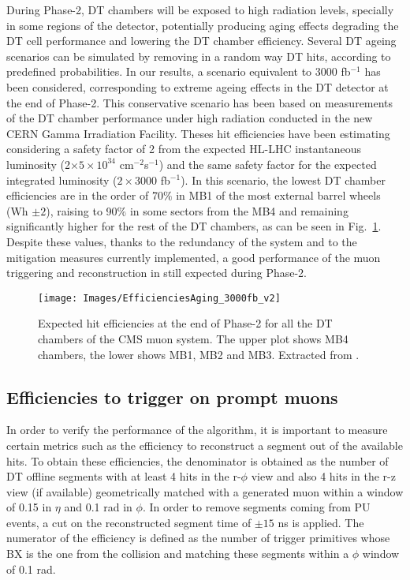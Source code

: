 \documentclass[../main.tex]{subfiles}
\begin{document}
During Phase-2, DT chambers will be exposed to high radiation levels, specially in some regions of the detector, potentially producing aging effects degrading the DT cell performance and lowering the DT chamber efficiency. Several DT ageing scenarios can be simulated by removing in a random way DT hits, according to predefined probabilities. In our results, a scenario equivalent to 3000 fb${}^{-1}$ has been considered, corresponding to extreme ageing effects in the DT detector at the end of Phase-2. This conservative scenario has been based on measurements of the DT chamber performance under high radiation conducted in the new CERN Gamma Irradiation Facility. Theses hit efficiencies have been estimating considering a safety factor of 2 from the expected HL-LHC instantaneous luminosity (2$\times 5\times 10^{34}$ cm${}^{-2}$s${}^{-1}$) and the same safety factor for the expected integrated luminosity ($2\times$3000 fb${}^{-1}$). In this scenario, the lowest DT chamber efficiencies are in the order of 70$\%$ in MB1 of the most external barrel wheels (Wh $\pm2$), raising to 90$\%$ in some sectors from the MB4 and remaining significantly higher for the rest of the DT chambers, as can be seen in Fig.~\ref{dts:fig:ageing}. Despite these values, thanks to the redundancy of the system and to the mitigation measures currently implemented, a good performance of the muon triggering and reconstruction in still expected during Phase-2.

\begin{figure}[h!]
\begin{center}
\texttt{[image: Images/EfficienciesAging\_3000fb\_v2]}
\end{center}
\caption{Expected hit efficiencies at the end of Phase-2 for all the DT chambers of the CMS muon system. The upper plot shows MB4 chambers, the lower shows MB1, MB2 and MB3. Extracted from \cite{dts:intro:am}.}
\label{dts:fig:ageing}
\end{figure}

\subsection{Efficiencies to trigger on prompt muons}

In order to verify the performance of the algorithm, it is important to measure certain metrics such as the efficiency to reconstruct a segment out of the available hits. To obtain these efficiencies, the denominator is obtained as the number of DT offline segments with at least 4 hits in the r-$\phi$ view and also 4 hits in the r-z view (if available) geometrically matched with a generated muon within a window of 0.15 in $\eta$ and 0.1 rad in $\phi$. In order to remove segments coming from PU events, a cut on the reconstructed segment time of $\pm 15$ ns is applied. The numerator of the efficiency is defined as the number of trigger primitives whose BX is the one from the collision and matching these segments within a $\phi$ window of 0.1 rad.
\end{document}
